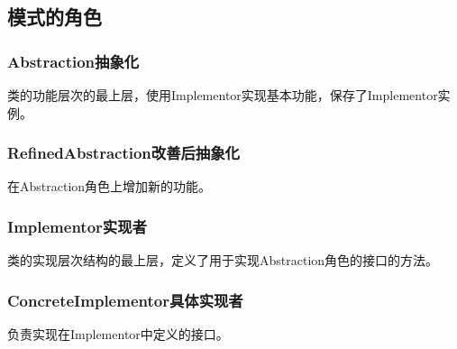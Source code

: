 \subsection{模式的角色}
\subsubsection{Abstraction抽象化}
类的功能层次的最上层，使用Implementor实现基本功能，保存了Implementor实例。
\subsubsection{RefinedAbstraction改善后抽象化}
在Abstraction角色上增加新的功能。
\subsubsection{Implementor实现者}
类的实现层次结构的最上层，定义了用于实现Abstraction角色的接口的方法。
\subsubsection{ConcreteImplementor具体实现者}
负责实现在Implementor中定义的接口。
